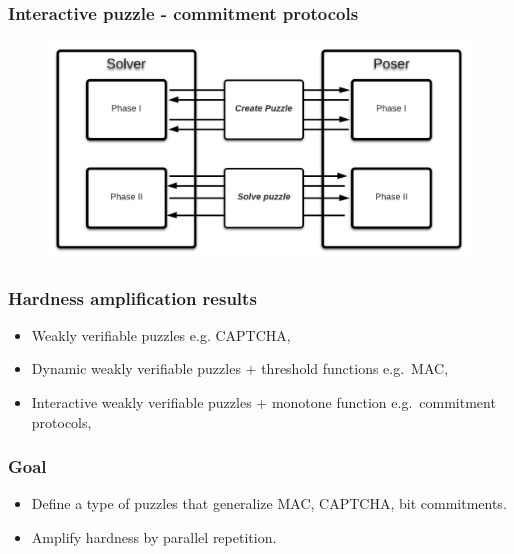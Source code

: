 \documentclass[first,firstsupp,last]{ETHclass}
\begin{document}
\begin{frame}[t]
  \frametitle{Interactive puzzle - commitment protocols}
  \begin{figure}
    \includegraphics[scale=0.43]{images/IntProtocol.pdf}
  \end{figure}
\end{frame}

\begin{frame}[t]
  \frametitle{Hardness amplification results}
  \begin{itemize}
    \item<1-3> Weakly verifiable puzzles e.g. CAPTCHA, \cite{canetti2005hardness}
    \item<2-3> Dynamic weakly verifiable puzzles $+$ threshold functions e.g.~MAC,\cite{dodis2009security}
    \item<3> Interactive weakly verifiable puzzles $+$ monotone function e.g.~commitment protocols, \cite{holenstein2011general}
  \end{itemize}
  \centering
\end{frame}

\begin{frame}[t]
  \frametitle{Goal}
  \begin{itemize}
    \item Define a type of puzzles that generalize MAC, CAPTCHA, bit commitments.
    \item Amplify hardness by parallel repetition.
  \end{itemize}
  \vspace{40pt}
  \begin{figure}
    \centering
  \end{figure}
\end{frame}
\end{document}
